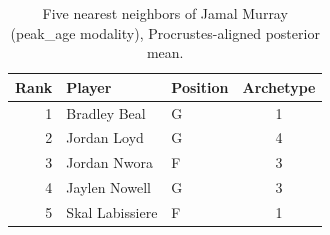\begin{table}[htbp]
  \centering\small
  \begin{tabular}{rllc}
    \toprule
    Rank & Player & Position & Archetype \\
    \midrule
    1 & Bradley Beal & G & 1 \\
    2 & Jordan Loyd & G & 4 \\
    3 & Jordan Nwora & F & 3 \\
    4 & Jaylen Nowell & G & 3 \\
    5 & Skal Labissiere & F & 1 \\
    \bottomrule
  \end{tabular}
  \caption{Five nearest neighbors of Jamal Murray (peak_age modality), Procrustes-aligned posterior mean.}
  \label{tab:Jamal_Murray_neighbors_peak_age}
\end{table}

